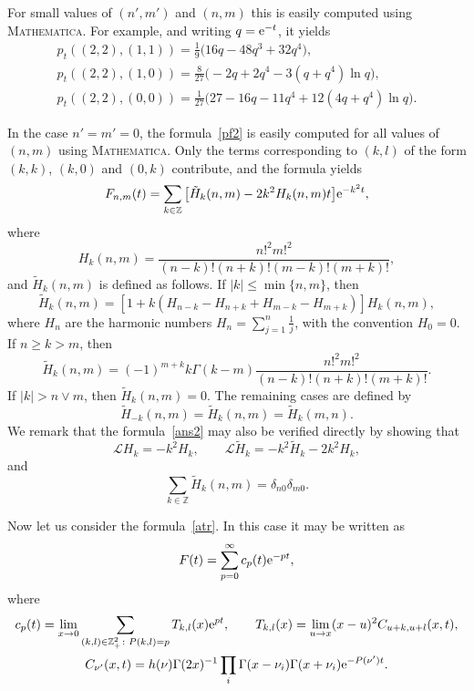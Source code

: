 \documentclass[pdftex]{sigma}
\theoremstyle{definition}
\newcommand\Z{{\mathbb Z}}
\newcommand\cL{{\mathcal L}}
\begin{document}
For small values of $(n',m')$ and $(n,m)$ this is easily computed using \textsc{Mathematica}.
For example, and writing $q={\rm e}^{-t}$, it yields
\begin{gather*}
p_t((2,2),(1,1))=\frac1{9}\big( 16 q- 48q^3+32 q^4\big),\\
p_t((2,2),(1,0))=\frac8{27}\bigl( -2q+2q^4-3( q+ q^4) \ln q\bigr),\\
p_t((2,2),(0,0))=\frac1{27}\big( 27-16 q - 11q^4+12 (4 q+q^4) \ln q\big).\end{gather*}

In the case $n'=m'=0$, the formula~\eqref{pf2} is easily computed for all values of $(n,m)$
using \textsc{Mathematica}.
Only the terms corresponding to $(k,l)$ of the form $(k,k)$, $(k,0)$ and $(0,k)$ contribute,
and the formula yields
\begin{equation}\label{ans2} F_{n,m} ( t) = \sum_{k\in\Z} \big[ \tilde H_k(n,m)- 2k^2 H_k(n,m) t \big] {\rm e}^{-k^2 t},\end{equation}
where
\[H_k(n,m)=\frac{n!^2m!^2}{(n-k)!(n+k)!(m-k)!(m+k)!},\]
and $\tilde H_k(n,m)$ is defined as follows. If $|k|\le \min\{n, m\}$, then
\[\tilde H_k(n,m)=\left[ 1+k(H_{n-k}-H_{n+k}+H_{m-k}-H_{m+k}) \right] H_k(n,m),\]
where $H_n$ are the harmonic numbers
$H_n=\sum_{j=1}^n \frac1{j}$,
with the convention $H_0=0$. If $n\ge k > m$, then
\[\tilde H_k(n,m)=(-1)^{m+k} k \Gamma(k-m) \frac{n!^2m!^2}{(n-k)!(n+k)!(m+k)!}.\]
If $|k|>n\vee m$, then $\tilde H_k(n,m)=0$. The remaining cases are defined by
\[\tilde H_{-k}(n,m)=\tilde H_k(n,m)=\tilde H_k(m,n).\]
We remark that the formula~\eqref{ans2} may also be verified directly by showing that
\[\cL H_k = -k^2 H_k, \qquad \cL \tilde H_k = -k^2 \tilde H_k - 2k^2 H_k,\]
and
\[\sum_{k\in\Z} \tilde H_k(n,m) = \delta_{n0}\delta_{m0}.\]


Now let us consider the formula~\eqref{atr}. In this case it may be written as
\begin{equation}\label{F2} F(t)=\sum_{p=0}^\infty c_p(t) {\rm e}^{-pt},\end{equation}
where
\begin{gather*}
c_p(t)= \lim_{x\to 0} \sum_{(k,l)\in\Z_+^2\colon P(k,l)=p} T_{k,l}(x) {\rm e}^{pt},
\qquad
T_{k,l}(x)= \lim_{u\to x} (x-u)^2 C_{u+k,u+l}(x,t),\\
C_{\nu'}(x,t)= h(\nu) \Gamma(2x)^{-1} \prod_i\Gamma(x-\nu_i) \Gamma(x+\nu_i) {\rm e}^{-P(\nu') t}.\end{gather*}
\end{document}
